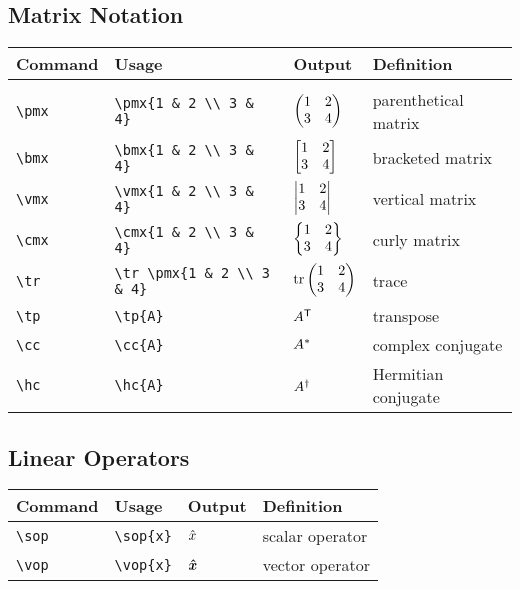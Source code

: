 \documentclass[11pt]{article}
\begin{document}
\subsection{Matrix Notation}

\begin{tabular}{llll}
    Command     & Usage                           & Output      & Definition          \\
    \hline                                                                            \\ [-3ex]
    \verb|\pmx| & \verb|\pmx{1 & 2 \\ 3 & 4}|     & $\begin{pmatrix} 1     & 2                   \\ 3 & 4 \end{pmatrix}$     & parenthetical matrix \\ [3ex]
    \verb|\bmx| & \verb|\bmx{1 & 2 \\ 3 & 4}|     & $\begin{bmatrix} 1     & 2                   \\ 3 & 4 \end{bmatrix}$     & bracketed matrix     \\ [3ex]
    \verb|\vmx| & \verb|\vmx{1 & 2 \\ 3 & 4}|     & $\begin{vmatrix} 1     & 2                   \\ 3 & 4 \end{vmatrix}$     & vertical matrix      \\ [3ex]
    \verb|\cmx| & \verb|\cmx{1 & 2 \\ 3 & 4}|     & $\begin{Bmatrix} 1     & 2                   \\ 3 & 4 \end{Bmatrix}$     & curly matrix         \\ [3ex]
    \verb|\tr|  & \verb|\tr \pmx{1 & 2 \\ 3 & 4}| & $\operatorname{tr} \begin{pmatrix} 1 & 2                   \\ 3 & 4 \end{pmatrix}$ & trace                \\ [3ex]
    \verb|\tp|  & \verb|\tp{A}|                   & $A^\textsf{T}$    & transpose           \\
    \verb|\cc|  & \verb|\cc{A}|                   & $A^*$    & complex conjugate   \\
    \verb|\hc|  & \verb|\hc{A}|                   & $A^\dag$    & Hermitian conjugate \\
\end{tabular}

\subsection{Linear Operators}

\begin{tabular}{llll}
    Command     & Usage          & Output    & Definition      \\
    \hline
    \verb|\sop| & \verb|\sop{x}| & $\hat{x}$ & scalar operator \\
    \verb|\vop| & \verb|\vop{x}| & $\bm{\hat{x}}$ & vector operator \\
\end{tabular}
\end{document}
